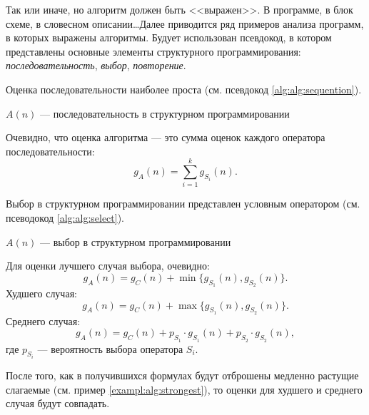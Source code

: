 Так или иначе, но алгоритм должен быть <<выражен>>. В программе, в блок схеме, в словесном описании\ldots Далее приводится ряд примеров анализа программ, в которых выражены алгоритмы. Будует использован псевдокод, в котором представлены основные элементы структурного программирования: \emph{последовательность}, \emph{выбор}, \emph{повторение}.

Оценка последовательности наиболее проста (см. псевдокод \ref{alg:alg:sequention}). 
\begin{algorithm}
    \caption{$A(n)$ --- последовательность в структурном программировании}
    \label{alg:alg:sequention}
    \begin{algorithmic}[1]
        
        \STATE{$\ldots$} 
    \end{algorithmic}
\end{algorithm}
Очевидно, что оценка алгоритма --- это сумма оценок каждого оператора последовательности:
\[
g_A(n)=\sum_{i=1}^{k} g_{S_i}(n).
\]

Выбор в структурном программировании представлен условным оператором (см. псеводокод \ref{alg:alg:select}).
\begin{algorithm}
    \caption{$A(n)$ --- выбор в структурном программировании}
    \label{alg:alg:select}
    \begin{algorithmic}[1]
        
        \ELSE
        \ENDIF
    \end{algorithmic}
\end{algorithm}
Для оценки лучшего случая выбора, очевидно:
\[g_A(n)=g_C(n)+\min\{g_{S_1}(n), g_{S_2}(n)\}.\]
Худшего случая:
\[g_A(n)=g_C(n)+\max\{g_{S_1}(n), g_{S_2}(n)\}.\]
Среднего случая:
\[g_A(n)=g_C(n) + p_{S_1}\cdot g_{S_1}(n) + p_{S_2}\cdot g_{S_2}(n),\]
где $p_{S_i}$ --- вероятность выбора оператора $S_i$.

После того, как в получившихся формулах будут отброшены медленно растущие слагаемые (см. пример \ref{exampl:alg:strongest}), то оценки для худшего и среднего случая будут совпадать.

